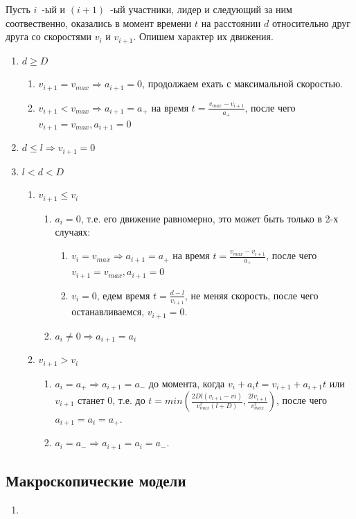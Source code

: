 \documentclass[12pt, a4paper]{article}
\begin{document}
Пусть $i$~-ый и $(i+1)$~-ый участники, лидер и следующий за ним соотвественно, оказались в момент времени $t$ на расстоянии $d$ относительно друг друга со скоростями $v_i$ и $v_{i+1}$. Опишем характер их движения.
\begin{enumerate}
	\item $d \ge D $
	\begin{enumerate}
		\item $v_{i+1} = v_{max} \Rightarrow a_{i+1} = 0$, продолжаем ехать с максимальной скоростью.
		\item $v_{i+1} < v_{max} \Rightarrow a_{i+1} = a_+$ на время $t = \frac{v_{max}-v_{i+1}}{a_+}$, после чего $v_{i+1} = v_{max}, a_{i+1} = 0$
	\end{enumerate}	
	\item $d \leq l \Rightarrow v_{i+1} = 0$
	\item $l < d < D $
	\begin{enumerate}
	\item $v_{i+1} \leq v_i$
		\begin{enumerate}
			\item $a_i = 0$, т.е. его движение равномерно, это может быть только в 2-х случаях:
			\begin{enumerate}
				\item $v_i = v_{max} \Rightarrow a_{i+1} = a_+$ на время $t = \frac{v_{max}-v_{i+1}}{a_+}$, после чего $v_{i+1} = v_{max}, a_{i+1} = 0$
				\item $v_i = 0$, едем время $t = \frac{d-l}{v_{i+1}}$, не меняя скорость, после чего останавливаемся, $v_{i+1} = 0$.
			\end{enumerate}	
			\item $a_i \neq 0 \Rightarrow a_{i+1} = a_i$ 
		\end{enumerate}
	\item $v_{i+1} > v_i$ 
	\begin{enumerate}
		\item $a_i = a_+ \Rightarrow a_{i+1} = a_-$ до момента, когда $v_i + a_it = v_{i+1} + a_{i+1}t$ или $v_{i+1}$ станет $0$, т.е. до $t = min\left(\frac{2Dl(v_{i+1}-vi)}{v^2_{max}(l+D)}, \frac{2lv_{i+1}}{v^2_{max}}\right)$,  после чего $a_{i+1} = a_i = a_+$. 
		\item $a_i = a_- \Rightarrow a_{i+1} = a_i = a_-$.
	\end{enumerate}	
	\end{enumerate}
\end{enumerate}

\subsection{Макроскопические модели}
\begin{enumerate}
	\item 
	
\end{enumerate}
\end{document}
